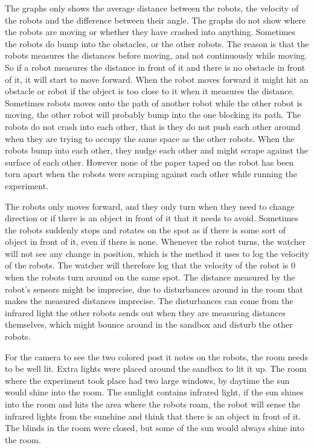 The graphs only shows the average distance between the robots, the velocity of the robots and the difference between their angle. The graphs do not show where the robots are moving or whether they have crashed into anything.
Sometimes the robots do bump into the obstacles, or the other robots. The reason is that the robots measures the distances before moving, and not continuously while moving. So if a robot measures the distance in front of it and there is no obstacle in front of it, it will start to move forward. When the robot moves forward it might hit an obstacle or robot if the object is too close to it when it measures the distance. Sometimes robots moves onto the path of another robot while the other robot is moving, the other robot will probably bump into the one blocking its path. The robots do not crash into each other, that is they do not push each other around when they are trying to occupy the same space as the other robots. When the robots bump into each other, they nudge each other and might scrape against the surface of each other. However none of the paper taped on the robot has been torn apart when the robots were scraping against each other while running the experiment.

The robots only moves forward, and they only turn when they need to change direction or if there is an object in front of it that it needs to avoid. Sometimes the robots suddenly stops and rotates on the spot as if there is some sort of object in front of it, even if there is none.
Whenever the robot turns, the watcher will not see any change in position, which is the method it uses to log the velocity of the robots. The watcher will therefore log that the velocity of the robot is 0 when the robots turn around on the same spot. 
The distance measured by the robot's sensors might be imprecise, due to disturbances around in the room that makes the measured distances imprecise. The disturbances can come from the infrared light the other robots sends out when they are measuring distances themselves, which might bounce around in the sandbox and disturb the other robots. 

For the camera to see the two colored post it notes on the robots, the room needs to be well lit. Extra lights were placed around the sandbox to lit it up. The room where the experiment took place had two large windows, by daytime the sun would shine into the room. The sunlight contains infrared light, if the sun shines into the room and hits the area where the robots roam, the robot will sense the infrared lights from the sunshine and think that there is an object in front of it. The blinds in the room were closed, but some of the sun would always shine into the room.
